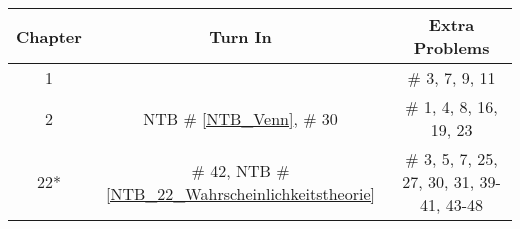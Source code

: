 \documentclass[12pt]{article}
\begin{document}
\begin{center}
\begin{tabular}{|c|c||c|}
\hline
Chapter & Turn In & Extra Problems\\
\hline

1 &     & \# 3, 7, 9, 11 \\  %
\hline
2  & NTB \# \ref{NTB_Venn}, \# 30 & \# 1, 4, 8, 16, 19, 23\\  %
\hline	
22* & \# 42, NTB \# \ref{NTB_22_Wahrscheinlichkeitstheorie} & \# 3, 5, 7, 25, 27, 30, 31, 39-41, 43-48\\ %
\hline


%





\end{tabular}
\end{center}
\end{document}
